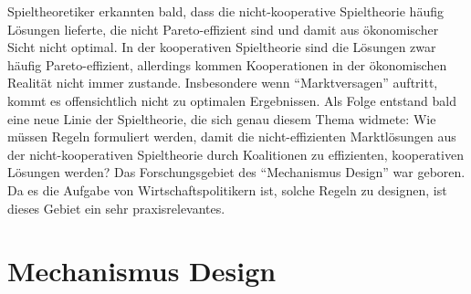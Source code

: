 Spieltheoretiker erkannten bald, dass die nicht-kooperative Spieltheorie häufig Lösungen lieferte, die nicht Pareto-effizient sind und damit aus ökonomischer Sicht nicht optimal. In der kooperativen Spieltheorie sind die Lösungen zwar häufig Pareto-effizient, allerdings kommen Kooperationen in der ökonomischen Realität nicht immer zustande. Insbesondere wenn "`Marktversagen"' auftritt, kommt es offensichtlich nicht zu optimalen Ergebnissen. Als Folge entstand bald eine neue Linie der Spieltheorie, die sich genau diesem Thema widmete: Wie müssen Regeln formuliert werden, damit die nicht-effizienten Marktlösungen aus der nicht-kooperativen Spieltheorie durch Koalitionen zu effizienten, kooperativen Lösungen werden? Das Forschungsgebiet des "`Mechanismus Design"' war geboren. Da es die Aufgabe von Wirtschaftspolitikern ist, solche Regeln zu designen, ist dieses Gebiet ein sehr praxisrelevantes.


\section{Mechanismus Design}

